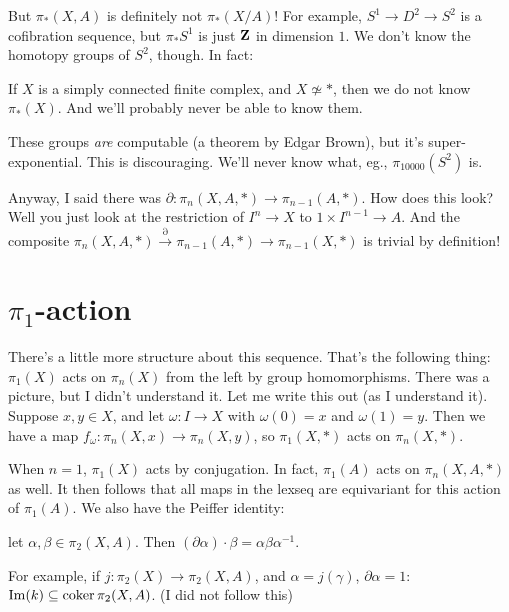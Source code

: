 But $\pi_\ast(X,A)$ is definitely not $\pi_\ast(X/A)$! For example, $S^1\to D^2\to S^2$ is a cofibration sequence, but $\pi_\ast S^1$ is just $\mathbf Z$ in dimension $1$. We don't know the homotopy groups of $S^2$, though. In fact:
\begin{theorem}[Now]
    If $X$ is a simply connected finite complex, and $X\not\simeq \ast$, then we do not know $\pi_\ast(X)$. And we'll probably never be able to know them.
\end{theorem}
These groups \emph{are} computable (a theorem by Edgar Brown), but it's super-exponential. This is discouraging. We'll never know what, eg., $\pi_{10000}(S^2)$ is.

Anyway, I said there was $\partial:\pi_n(X,A,\ast)\to \pi_{n-1}(A,\ast)$. How does this look? Well you just look at the restriction of $I^n\to X$ to $1\times I^{n-1}\to A$. And the composite $\pi_n(X,A,\ast)\xrightarrow{\partial}\pi_{n-1}(A,\ast)\to \pi_{n-1}(X,\ast)$ is trivial by definition!
\section{$\pi_1$-action}
There's a little more structure about this sequence. That's the following thing: $\pi_1(X)$ acts on $\pi_n(X)$ from the left by group homomorphisms. There was a picture, but I didn't understand it. Let me write this out (as I understand it). Suppose $x,y\in X$, and let $\omega:I\to X$ with $\omega(0) = x$ and $\omega(1) = y$. Then we have a map $f_\omega:\pi_n(X,x)\to \pi_n(X,y)$, so $\pi_1(X,\ast)$ acts on $\pi_n(X,\ast)$.

When $n=1$, $\pi_1(X)$ acts by conjugation. In fact, $\pi_1(A)$ acts on $\pi_n(X,A,\ast)$ as well. It then follows that all maps in the lexseq are equivariant for this action of $\pi_1(A)$. We also have the Peiffer identity:
\begin{prop}
    let $\alpha,\beta\in \pi_2(X,A)$. Then $(\partial \alpha)\cdot\beta = \alpha\beta\alpha^{-1}$.
\end{prop}
For example, if $j:\pi_2(X)\to \pi_2(X,A)$, and $\alpha = j(\gamma)$, $\partial\alpha = 1$: $\operatorname{Im}(k)\subseteq\operatorname{coker} \pi_2(X,A)$. (I did not follow this)

